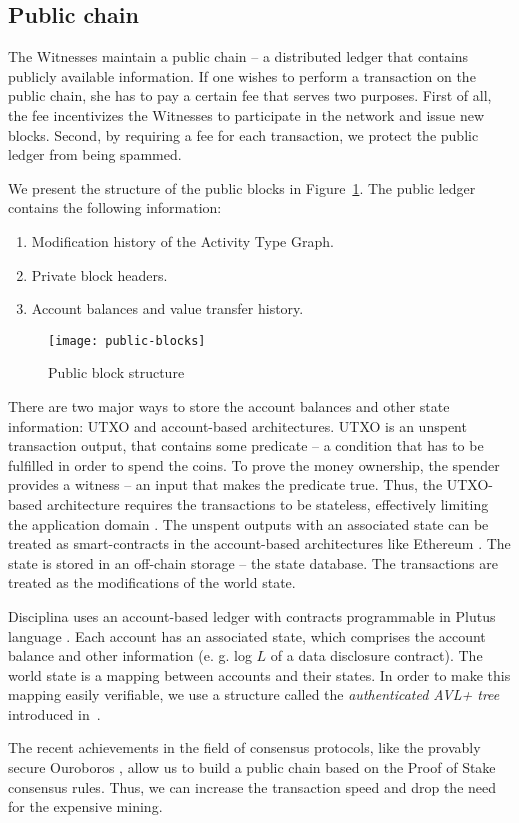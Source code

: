 \subsection{Public chain}
The Witnesses maintain a public chain -- a distributed ledger that contains publicly available information. If one wishes to perform a transaction on the public chain, she has to pay a certain fee that serves two purposes. First of all, the fee incentivizes the Witnesses to participate in the network and issue new blocks. Second, by requiring a fee for each transaction, we protect the public ledger from being spammed.

We present the structure of the public blocks in Figure~\ref{fig:publicblocks}. The public ledger contains the following information:
\begin{enumerate}
\item Modification history of the Activity Type Graph.
\item Private block headers.
\item Account balances and value transfer history.
\end{enumerate}

\begin{figure}[ht]
\centering
\texttt{[image: public-blocks]}
\caption{Public block structure}
\label{fig:publicblocks}
\end{figure}

There are two major ways to store the account balances and other state information: UTXO and account-based architectures. UTXO is an unspent transaction output, that contains some predicate -- a condition that has to be fulfilled in order to spend the coins. To prove the money ownership, the spender provides a witness -- an input that makes the predicate true. Thus, the UTXO-based architecture requires the transactions to be stateless, effectively limiting the application domain \cite{bentov2017instantaneous}.  The unspent outputs with an associated state can be treated as smart-contracts in the account-based architectures like Ethereum \cite{wood2014ethereum}. The state is stored in an off-chain storage -- the state database. The transactions are treated as the modifications of the world state.

Disciplina uses an account-based ledger with contracts programmable in Plutus language \cite{Plutus}. Each account has an associated state, which comprises the account balance and other information (e. g. log $L$ of a data disclosure contract). The world state is a mapping between accounts and their states. In order to make this mapping easily verifiable, we use a structure called the \textit{authenticated AVL+ tree} introduced in~\cite{reyzin2016improving}.

The recent achievements in the field of consensus protocols, like the provably secure Ouroboros \cite{kiayias2017ouroboros}, allow us to build a public chain based on the Proof of Stake consensus rules. Thus, we can increase the transaction speed and drop the need for the expensive mining.

